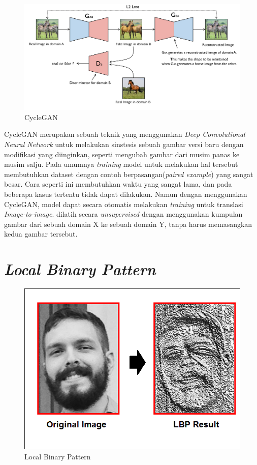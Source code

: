 \begin{figure}  [!htb]
	\includegraphics[scale=0.2]{img/cyclegan.png}
	\caption{CycleGAN}
	\label{fig: 3_27}
\end{figure}

CycleGAN merupakan sebuah teknik yang menggunakan \textit{Deep Convolutional Neural Network} untuk melakukan sinstesis sebuah gambar versi baru dengan modifikasi yang diinginkan, seperti mengubah gambar dari musim panas ke musim salju. Pada umumnya \textit{training} model untuk melakukan hal tersebut membutuhkan dataset dengan contoh berpasangan(\textit{paired example}) yang sangat besar. Cara seperti ini membutuhkan waktu yang sangat lama, dan pada beberapa kasus tertentu tidak dapat dilakukan. Namun dengan menggunakan CycleGAN, model dapat secara otomatis melakukan \textit{training} untuk translasi \textit{Image-to-image}.  dilatih secara \textit{unsupervised} dengan menggunakan kumpulan gambar dari sebuah domain X ke sebuah domain Y, tanpa harus memasangkan kedua gambar tersebut.

\section{\textit{Local Binary Pattern}}
\vspace{1ex}

\begin{figure}  [!htb]
	\centering
	\includegraphics[scale=0.2]{img/lbp.png}
	\caption{Local Binary Pattern}
	\label{fig: 3_27}
\end{figure}

